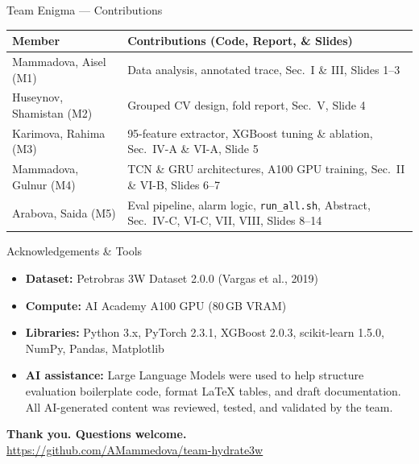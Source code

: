 \documentclass[aspectratio=169,10pt]{beamer}
\begin{document}
\begin{frame}{Team Enigma — Contributions}
  \begin{table}
    \footnotesize
    \begin{tabular}{p{3.5cm} p{8.2cm}}
      \toprule
      \textbf{Member} & \textbf{Contributions (Code, Report, \& Slides)} \\
      \midrule
      Mammadova, Aisel (M1) & Data analysis, annotated trace, Sec.~I \& III, Slides 1--3 \\
      \addlinespace[3pt]
      Huseynov, Shamistan (M2) & Grouped CV design, fold report, Sec.~V, Slide 4 \\
      \addlinespace[3pt]
      Karimova, Rahima (M3) & 95-feature extractor, XGBoost tuning \& ablation, Sec.~IV-A \& VI-A, Slide 5 \\
      \addlinespace[3pt]
      Mammadova, Gulnur (M4) & TCN \& GRU architectures, A100 GPU training, Sec.~II \& VI-B, Slides 6--7 \\
      \addlinespace[3pt]
      Arabova, Saida (M5) & Eval pipeline, alarm logic, \texttt{run\_all.sh}, Abstract, Sec.~IV-C, VI-C, VII, VIII, Slides 8--14 \\
      \bottomrule
    \end{tabular}
  \end{table}
\end{frame}

\begin{frame}{Acknowledgements \& Tools}
  \begin{itemize}
    \item \textbf{Dataset:} Petrobras 3W Dataset 2.0.0 (Vargas et al., 2019)
    \item \textbf{Compute:} AI Academy A100 GPU (80\,GB VRAM)
    \item \textbf{Libraries:} Python 3.x, PyTorch 2.3.1, XGBoost 2.0.3, scikit-learn 1.5.0, NumPy, Pandas, Matplotlib
    \item \textbf{AI assistance:} Large Language Models were used to help structure evaluation boilerplate code, format \LaTeX{} tables, and draft documentation. All AI-generated content was reviewed, tested, and validated by the team.
  \end{itemize}
  \vspace{1em}
  \begin{center}
    \Large \textbf{Thank you. Questions welcome.}\\[0.5em]
    \normalsize \url{https://github.com/AMammedova/team-hydrate3w}
  \end{center}
\end{frame}
\end{document}
